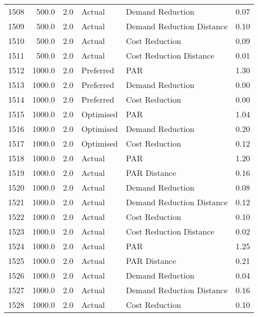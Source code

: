 \begin{longtable}{lrrllr}
1508 &        500.0 &     2.0 &         Actual &           Demand Reduction &   0.07 \\
1509 &        500.0 &     2.0 &         Actual &  Demand Reduction Distance &   0.10 \\
1510 &        500.0 &     2.0 &         Actual &             Cost Reduction &   0.09 \\
1511 &        500.0 &     2.0 &         Actual &    Cost Reduction Distance &   0.01 \\
1512 &       1000.0 &     2.0 &      Preferred &                        PAR &   1.30 \\
1513 &       1000.0 &     2.0 &      Preferred &           Demand Reduction &   0.00 \\
1514 &       1000.0 &     2.0 &      Preferred &             Cost Reduction &   0.00 \\
1515 &       1000.0 &     2.0 &      Optimised &                        PAR &   1.04 \\
1516 &       1000.0 &     2.0 &      Optimised &           Demand Reduction &   0.20 \\
1517 &       1000.0 &     2.0 &      Optimised &             Cost Reduction &   0.12 \\
1518 &       1000.0 &     2.0 &         Actual &                        PAR &   1.20 \\
1519 &       1000.0 &     2.0 &         Actual &               PAR Distance &   0.16 \\
1520 &       1000.0 &     2.0 &         Actual &           Demand Reduction &   0.08 \\
1521 &       1000.0 &     2.0 &         Actual &  Demand Reduction Distance &   0.12 \\
1522 &       1000.0 &     2.0 &         Actual &             Cost Reduction &   0.10 \\
1523 &       1000.0 &     2.0 &         Actual &    Cost Reduction Distance &   0.02 \\
1524 &       1000.0 &     2.0 &         Actual &                        PAR &   1.25 \\
1525 &       1000.0 &     2.0 &         Actual &               PAR Distance &   0.21 \\
1526 &       1000.0 &     2.0 &         Actual &           Demand Reduction &   0.04 \\
1527 &       1000.0 &     2.0 &         Actual &  Demand Reduction Distance &   0.16 \\
1528 &       1000.0 &     2.0 &         Actual &             Cost Reduction &   0.10 \\

\end{longtable}
